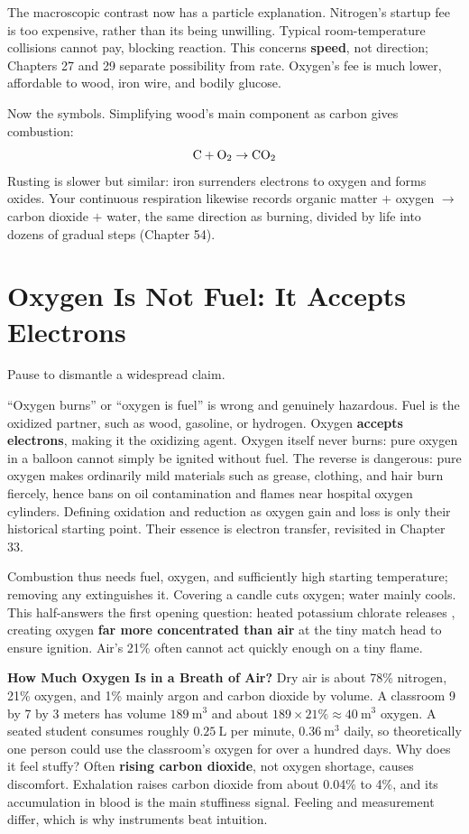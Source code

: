 The macroscopic contrast now has a particle explanation. Nitrogen's startup fee is too expensive, rather than its being unwilling. Typical room-temperature collisions cannot pay, blocking reaction. This concerns \textbf{speed}, not direction; Chapters 27 and 29 separate possibility from rate. Oxygen's fee is much lower, affordable to wood, iron wire, and bodily glucose.

Now the symbols. Simplifying wood's main component as carbon gives combustion:
\[\mathrm{C} + \mathrm{O_2} \rightarrow \mathrm{CO_2}\]
Rusting is slower but similar: iron surrenders electrons to oxygen and forms oxides. Your continuous respiration likewise records organic matter $+$ oxygen $\rightarrow$ carbon dioxide $+$ water, the same direction as burning, divided by life into dozens of gradual steps (Chapter 54).

\section{Oxygen Is Not Fuel: It Accepts Electrons}

Pause to dismantle a widespread claim.

\begin{wuqu}
``Oxygen burns'' or ``oxygen is fuel'' is wrong and genuinely hazardous. Fuel is the oxidized partner, such as wood, gasoline, or hydrogen. Oxygen \textbf{accepts electrons}, making it the oxidizing agent. Oxygen itself never burns: pure oxygen in a balloon cannot simply be ignited without fuel. The reverse is dangerous: pure oxygen makes ordinarily mild materials such as grease, clothing, and hair burn fiercely, hence bans on oil contamination and flames near hospital oxygen cylinders. Defining oxidation and reduction as oxygen gain and loss is only their historical starting point. Their essence is electron transfer, revisited in Chapter 33.
\end{wuqu}

Combustion thus needs fuel, oxygen, and sufficiently high starting temperature; removing any extinguishes it. Covering a candle cuts oxygen; water mainly cools. This half-answers the first opening question: heated potassium chlorate releases , creating oxygen \textbf{far more concentrated than air} at the tiny match head to ensure ignition. Air's 21\% often cannot act quickly enough on a tiny flame.

\begin{qiaoliang}
\textbf{How Much Oxygen Is in a Breath of Air?} Dry air is about 78\% nitrogen, 21\% oxygen, and 1\% mainly argon and carbon dioxide by volume. A classroom 9 by 7 by 3 meters has volume $189\ \mathrm{m^3}$ and about $189\times 21\% \approx 40\ \mathrm{m^3}$ oxygen. A seated student consumes roughly $0.25\ \mathrm{L}$ per minute, $0.36\ \mathrm{m^3}$ daily, so theoretically one person could use the classroom's oxygen for over a hundred days. Why does it feel stuffy? Often \textbf{rising carbon dioxide}, not oxygen shortage, causes discomfort. Exhalation raises carbon dioxide from about 0.04\% to 4\%, and its accumulation in blood is the main stuffiness signal. Feeling and measurement differ, which is why instruments beat intuition.
\end{qiaoliang}

